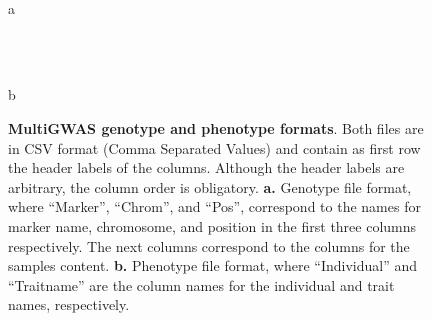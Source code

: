 \begin{figure}[H]
\begin{centering}
\begin{minipage}[t]{0.6\columnwidth}%
\begin{center}
\\
a
\par\end{center}%
\end{minipage}~~~~~~~~~%
\begin{minipage}[t]{0.3\columnwidth}%
\begin{center}
\\
b
\par\end{center}%
\end{minipage}
\par\end{centering}
\begin{centering}
\par\end{centering}
\caption{\textbf{MultiGWAS genotype and phenotype formats}. Both files are in CSV format (Comma Separated Values) and contain as first row the header labels of the columns. Although the header labels are arbitrary, the column order is obligatory. \textbf{a.} Genotype file format, where ``Marker'', ``Chrom'', and ``Pos'', correspond to the names for marker name, chromosome, and position in the first three columns respectively. The next columns correspond to the columns for the samples content. \textbf{b.} Phenotype file format, where ``Individual'' and ``Traitname'' are the column names for the individual and trait names, respectively.\label{fig:File-Formats}}
\end{figure}

